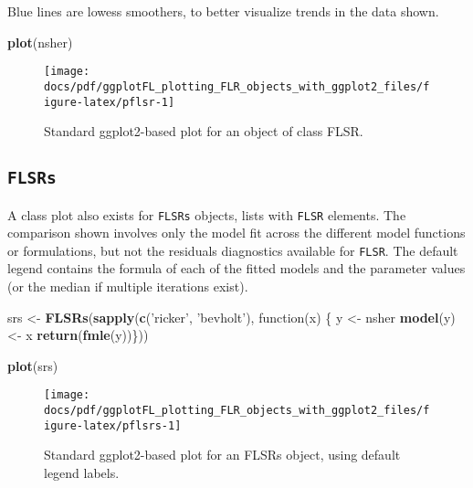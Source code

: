 \documentclass[]{article}
\newenvironment{Shaded}{\begin{snugshade}}{\end{snugshade}}
\newcommand{\KeywordTok}[1]{\textcolor[rgb]{0.13,0.29,0.53}{\textbf{{#1}}}}
\newcommand{\StringTok}[1]{\textcolor[rgb]{0.31,0.60,0.02}{{#1}}}
\newcommand{\NormalTok}[1]{{#1}}
\begin{document}
Blue lines are lowess smoothers, to better visualize trends in the data
shown.

\begin{Shaded}
\begin{Highlighting}[]
\KeywordTok{plot}\NormalTok{(nsher)}
\end{Highlighting}
\end{Shaded}

\begin{figure}

{\centering \texttt{[image: docs/pdf/ggplotFL\_plotting\_FLR\_objects\_with\_ggplot2\_files/figure-latex/pflsr-1]} 

}

\caption{Standard ggplot2-based plot for an object of class FLSR.}\label{fig:pflsr}
\end{figure}

\subsection{\texorpdfstring{\texttt{FLSRs}}{FLSRs}}\label{flsrs}

A class plot also exists for \texttt{FLSRs} objects, lists with
\texttt{FLSR} elements. The comparison shown involves only the model fit
across the different model functions or formulations, but not the
residuals diagnostics available for \texttt{FLSR}. The default legend
contains the formula of each of the fitted models and the parameter
values (or the median if multiple iterations exist).

\begin{Shaded}
\begin{Highlighting}[]
\NormalTok{srs <-}\StringTok{ }\KeywordTok{FLSRs}\NormalTok{(}\KeywordTok{sapply}\NormalTok{(}\KeywordTok{c}\NormalTok{(}\StringTok{'ricker'}\NormalTok{, }\StringTok{'bevholt'}\NormalTok{), function(x) \{}
         \NormalTok{y <-}\StringTok{ }\NormalTok{nsher}
         \KeywordTok{model}\NormalTok{(y) <-}\StringTok{ }\NormalTok{x}
         \KeywordTok{return}\NormalTok{(}\KeywordTok{fmle}\NormalTok{(y))\}))}
\end{Highlighting}
\end{Shaded}

\begin{Shaded}
\begin{Highlighting}[]
\KeywordTok{plot}\NormalTok{(srs)}
\end{Highlighting}
\end{Shaded}

\begin{figure}

{\centering \texttt{[image: docs/pdf/ggplotFL\_plotting\_FLR\_objects\_with\_ggplot2\_files/figure-latex/pflsrs-1]} 

}

\caption{Standard ggplot2-based plot for an FLSRs object, using default legend labels.}\label{fig:pflsrs}
\end{figure}
\end{document}
